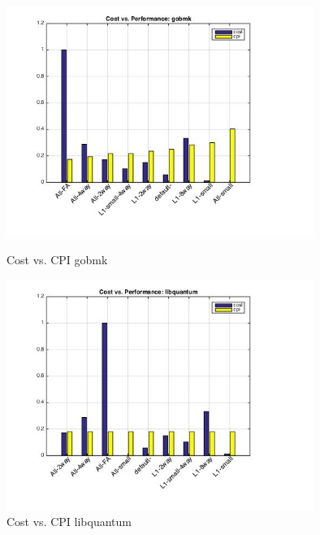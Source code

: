 \documentclass[11pt,titlepage]{article}
\begin{document}
        \begin{figure}[H]
            \centering
            \begin{minipage}{.5\textwidth}
                \centering
                \includegraphics[width=10cm]{cvpgobmk}
                \caption{Cost vs. CPI gobmk}
                \label{fig:cvpgobmk}
            \end{minipage}%
            \begin{minipage}{.5\textwidth}
                \centering
                \includegraphics[width=10cm]{cvplibquantum}
                \caption{Cost vs. CPI libquantum}
                \label{fig:cvplibquantum}
            \end{minipage}
        \end{figure}
\end{document}
